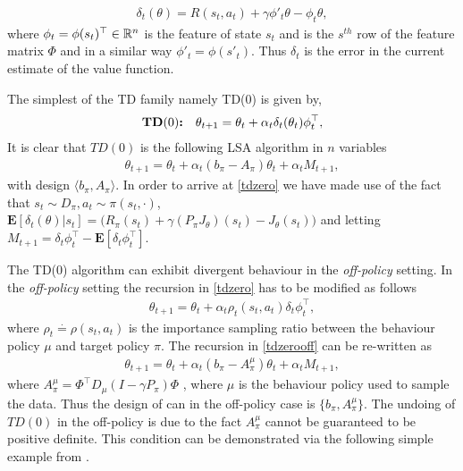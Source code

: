 \begin{align}\label{td}
\delta_t(\theta)=R(s_t,a_t)+\gamma \phi'_t\theta-\phi_t\theta,
\end{align}
where $\phi_t=\phi(s_t)^\top \in \mathbb{R}^n$ is the feature of state $s_t$ and is the $s^{th}$ row of the feature matrix $\Phi$ and in a similar way $\phi'_t=\phi(s'_t)$. Thus $\delta_t$ is the error in the current estimate of the value function.\par
The simplest of the TD family namely TD($0$) is given by,
\begin{align}\label{tdzero}
&\textbf{TD$(0)$:}&\theta_{t+1}=\theta_t+\alpha_t\delta_t(\theta_t)\phi_t^\top,
\end{align}
It is clear that $TD(0)$ is the following LSA algorithm in $n$ variables
\begin{align}\label{tdzero}
\theta_{t+1}=\theta_t+\alpha_t(b_\pi-A_\pi)\theta_t+\alpha_t M_{t+1},
\end{align} 
with design $\langle b_\pi,A_\pi \rangle$. In order to arrive at \eqref{tdzero} we have made use of the fact that $s_t\sim D_\pi, a_t\sim\pi(s_t,\cdot)$, $\mathbf{E}[\delta_t(\theta)|s_t]= \big(R_\pi(s_t)+\gamma (P_\pi J_\theta)(s_t) -J_\theta(s_t)\big)$ and letting $M_{t+1}=\delta_t\phi_t^\top-\mathbf{E}[\delta_t\phi_t^\top]$.\par
The TD($0$) algorithm can exhibit divergent behaviour in the \emph{off-policy} setting. In the \emph{off-policy} setting the recursion in \eqref{tdzero} has to be modified as follows
\begin{align}\label{tdzerooff}
\theta_{t+1}=\theta_t+\alpha_t\rho_t(s_t,a_t)\delta_t\phi_t^\top,
\end{align}
where $\rho_t\stackrel{\cdot}{=}\rho(s_t,a_t)$ is the importance sampling ratio between the behaviour policy $\mu$ and target policy $\pi$. The recursion in \eqref{tdzerooff} can be re-written as
\begin{align}\label{tdzerooffsa}
\theta_{t+1}=\theta_t+\alpha_t(b_\pi-A^\mu_\pi)\theta_t+\alpha_t M_{t+1},
\end{align}
where $A^{\mu}_\pi=\Phi^\top D_\mu (I-\gamma P_\pi)\Phi$ , where $\mu$ is the behaviour policy used to sample the data. Thus the design of \tdo can in the off-policy case is $\{b_\pi,A^\mu_\pi\}$.
The undoing of $TD(0)$ in the off-policy is due to the fact $A^\mu_\pi$ cannot be guaranteed to be positive definite. This condition can be demonstrated via the following simple example from \cite{etd}.
